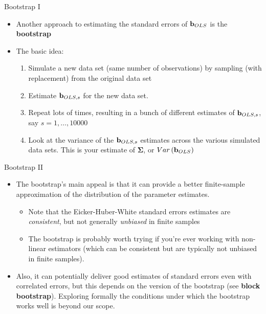 \begin{frame}{Bootstrap I}
\begin{itemize}
	\item Another approach to estimating the standard errors of ${\bf b}_{OLS}$
	is the {\bf bootstrap}

	\item The basic idea:
	\begin{enumerate}
		\item Simulate a new data set (same number of observations) by sampling (with replacement) from the original data set

		\item Estimate ${\bf b}_{OLS,s}$ for the new data set.

		\item Repeat lots of times, resulting in a bunch of different estimates of ${\bf b}_{OLS,s}$, say $s=1,\dots,10000$

		\item Look at the variance of the ${\bf b}_{OLS,s}$ estimates 
		across the various simulated data sets. This is your estimate of $\boldsymbol{\Sigma}$, or $Var\left({\bf b}_{OLS}\right)$
	\end{enumerate}

\end{itemize}
\end{frame}


\begin{frame}{Bootstrap II}
\begin{itemize}
	\item The bootstrap's main appeal is that it can provide a better finite-sample
	approximation of the distribution of the parameter estimates.
	\begin{itemize}
		\item Note that the Eicker-Huber-White standard errors estimates are \emph{consistent}, but
		not generally \emph{unbiased} in finite samples
		\item The bootstrap is probably worth trying if you're ever working with
		 non-linear estimators (which can be consistent but are typically not unbiased in finite samples). 
	\end{itemize}

	\medskip
	\item Also, it can potentially deliver good estimates of standard errors even with 
	correlated errors, but this depends on the version of the bootstrap (see {\bf block bootstrap}).
	 Exploring formally the  conditions under which the bootstrap works well is beyond our scope. 
\end{itemize}
\end{frame}


